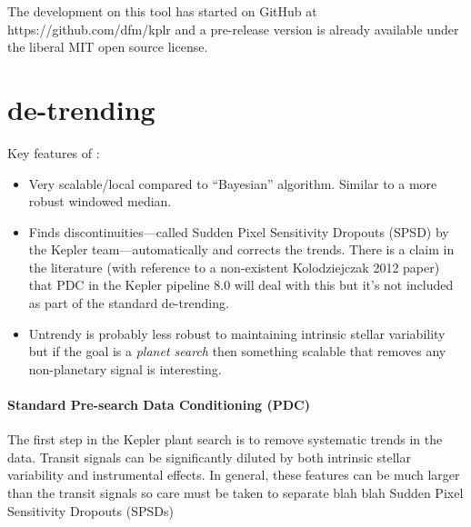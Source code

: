 \documentclass[letterpaper,12pt,preprint]{hack_aastex}
\begin{document}
The development on this tool has started on GitHub at
https://github.com/dfm/kplr and a pre-release version is already available
under the liberal MIT open source license.


\section{de-trending}

Key features of :
\begin{itemize}
\item Very scalable/local compared to ``Bayesian'' algorithm. Similar to
      a more robust windowed median.
\item Finds discontinuities---called Sudden Pixel Sensitivity Dropouts (SPSD)
      by the Kepler team---automatically and corrects the trends. There is a
      claim in the literature (with reference to a non-existent
      Kolodziejczak 2012 paper) that PDC in the Kepler pipeline 8.0 will deal
      with this but it's not included as part of the standard de-trending.
\item Untrendy is probably less robust to maintaining intrinsic stellar
      variability but if the goal is a \emph{planet search} then something
      scalable that removes any non-planetary signal is interesting.
\end{itemize}

\paragraph{Standard Pre-search Data Conditioning (PDC)}
The first step in the Kepler plant search is to remove systematic trends in
the data.
Transit signals can be significantly diluted by both intrinsic stellar
variability and instrumental effects. In general, these features can be much
larger than the transit signals so care must be taken to separate
blah blah Sudden Pixel Sensitivity Dropouts (SPSDs)
\end{document}
